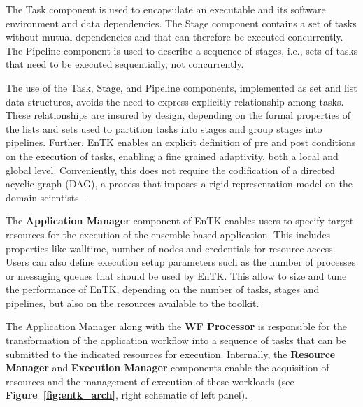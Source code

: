 The Task component is used to encapsulate an executable and 
its software environment and %
data dependencies. The Stage component contains a set of tasks without mutual
dependencies and that can therefore be executed concurrently. The Pipeline
component is used to describe a sequence of stages, i.e., %
sets of 
tasks that need to be executed sequentially, not concurrently.


The use of the Task, Stage, and Pipeline components, 
implemented as set and list data structures, avoids the need to express
explicitly relationship among tasks. These relationships are insured by
design, depending on the formal properties of the lists and sets used to
partition tasks into stages and group stages into pipelines.
Further, EnTK enables an explicit definition of pre and post conditions on
the execution of tasks, enabling a fine grained adaptivity, both a local and
global level. Conveniently, this does not require the codification of a
directed acyclic graph (DAG), a process that imposes a
rigid  representation model on the domain
scientists~\cite{balasubramanian2017powerofmany}.

The \textbf{Application Manager} component of EnTK enables users to specify
target resources for the execution of the ensemble-based application. This
includes properties like walltime, number of nodes and credentials for
resource access. Users can also define execution setup parameters such as the
number of processes or messaging queues that should be used by EnTK\@. This
allow to size and tune the performance of EnTK, depending on the number of
tasks, stages and pipelines, but also on the resources available to the
toolkit.

The Application Manager along with the \textbf{WF Processor} is responsible
for the transformation of the application workflow into a sequence of tasks
that can be submitted to the indicated resources for execution. Internally,
the \textbf{Resource Manager} and \textbf{Execution Manager} components
enable the acquisition of resources and the management of execution of these
workloads (see \textbf{Figure~\ref{fig:entk_arch}}, right schematic of left
panel).

